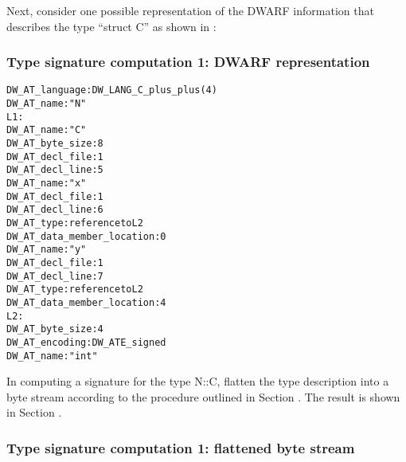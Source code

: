 Next, consider one possible representation of the DWARF
information that describes the type “struct C” as shown
in 
:

\subsubsection{Type signature  computation 1: DWARF representation}
\label{app:typesignaturecomputation1dwarfrepresentation}

\begin{alltt}
      DW\_AT\_language: DW\_LANG\_C\_plus\_plus (4)
        DW\_AT\_name: "N"
L1:
          DW\_AT\_name: "C"
          DW\_AT\_byte\_size: 8
          DW\_AT\_decl\_file: 1
          DW\_AT\_decl\_line: 5
            DW\_AT\_name: "x"
            DW\_AT\_decl\_file: 1
            DW\_AT\_decl\_line: 6
            DW\_AT\_type: reference to L2
            DW\_AT\_data\_member\_location: 0
            DW\_AT\_name: "y"
            DW\_AT\_decl\_file: 1
            DW\_AT\_decl\_line: 7
            DW\_AT\_type: reference to L2
            DW\_AT\_data\_member\_location: 4
L2:
         DW\_AT\_byte\_size: 4
         DW\_AT\_encoding: DW\_ATE\_signed
         DW\_AT\_name: "int"
\end{alltt}

In computing a signature for the type N::C, flatten the type
description into a byte stream according to the procedure
outlined in 
Section .
The result is shown in 
Section .

\subsubsection{Type signature  computation 1: flattened byte stream}
\label{app:typesignaturecomputation1flattenedbytestream}

